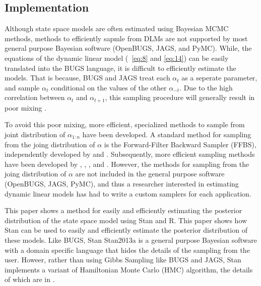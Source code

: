 \documentclass{article}
\begin{document}
\begin{itemize}
\section{Implementation}
\label{sec:implementation}


Although state space models are often estimated using Bayesian MCMC methods, methods to efficiently sapmle from DLMs are not supported by most general purpose Bayesian software (OpenBUGS, JAGS, and PyMC).
While, the  equations of the dynamic linear model (~\eqref{eq:8} and \eqref{eq:14}) can be easily translated into the BUGS language, it is difficult to efficiently estimate the models.
That is because, BUGS and JAGS treat each $\alpha_{t}$ as a seperate parameter, and sample $\alpha_{t}$ conditional on the values of the other $\alpha_{-t}$.
Due to the high correlation between $\alpha_{t}$ and $\alpha_{t+1}$, this sampling procedure will generally result in poor mixing \parencite[477]{Jackman2008}.

To avoid this poor mixing, more efficient, specialized methods to sample from joint distribution of $\alpha_{1:n}$ have been developed.
A standard method for sampling from the joing distribution of $\alpha$ is the Forward-Filter Backward Sampler (FFBS), independently developed by \textcite{CarterKohn1994} and \textcite{Fruehwirth-Schnatter1994}.
Subsequently, more efficient sampling methods have been developed by \textcite{DeJongShephard1995}, \textcite{DurbinKoopman2002}, \textcite{StricklandTurnerDenhamEtAl2009}, and \textcite{ChanJeliazkov2009}.
However, the methods for sampling from the joing distribution of $\alpha$ are not included in the general purpose software (OpenBUGS, JAGS, PyMC), and thus a researcher interested in estimating dynamic linear models has had to write a custom samplers for each application.

This paper shows a method for easily and efficiently estimating the posterior distribution of the state space model using Stan and R.
This paper shows how Stan can be used to easily and efficiently estimate the posterior distribution of these models.
Like BUGS, Stan \textcite{Stan2013}{Stan2013a} is a general purpose Bayesian software with a domain specific language that hides the details of the sampling from the user.
Howeer, rather than using Gibbs Sampling like BUGS and JAGS, Stan implements a variant of Hamiltonian Monte Carlo (HMC) algorithm, the details of which are in \textcite{HoffmanGelman2013}.


\end{itemize}
\end{document}
